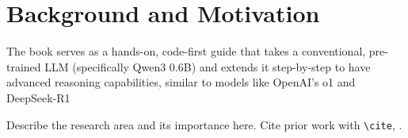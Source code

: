 \section{Background and Motivation}
\label{sec:intro-background}


The book serves as a hands-on, code-first guide that takes a conventional, pre-trained LLM (specifically Qwen3 0.6B) and extends it step-by-step to have advanced reasoning capabilities, similar to models like OpenAI's o1 and DeepSeek-R1

Describe the research area and its importance here. Cite prior work with
\verb|\cite|, \eg \cite{example2020}.

\nocite{example2020}
